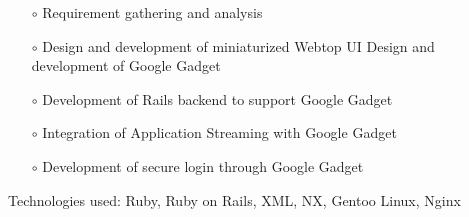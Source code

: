 \documentclass{scrartcl}
\begin{document}
\begin{cv}{
\href{http://www.develmj.com}{}
}
{\begin{itemize}
    \begin{itemize}
    \item[\footnotesize$\circ$] Requirement gathering and analysis
    \item[\footnotesize$\circ$] Design and development of miniaturized Webtop UI
    Design and development of Google Gadget
    \item[\footnotesize$\circ$] Development of Rails backend to support Google Gadget
    \item[\footnotesize$\circ$] Integration of Application Streaming with Google Gadget
    \item[\footnotesize$\circ$] Development of secure login through
      Google Gadget
    \end{itemize}
    Technologies used: Ruby, Ruby on Rails, XML, NX, Gentoo Linux,
    Nginx
\end{itemize}
}

\vspace{0.5em}


\end{cv}
\end{document}
